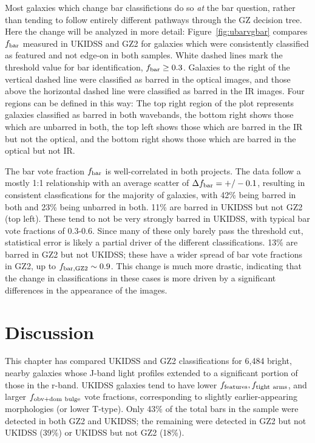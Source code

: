 Most galaxies which change bar classifictions do so \emph{at} the bar question, rather than tending to follow entirely different pathways through the GZ decision tree. Here the change will be analyzed in more detail: Figure~\ref{fig:ubarvgbar} compares $f_{\rm bar}$ measured in UKIDSS and GZ2 for galaxies which were consistently classified as featured and not edge-on in both samples. White dashed lines mark the threshold value for bar identification, $f_{\rm bar}\ge 0.3$. Galaxies to the right of the vertical dashed line were classified as barred in the optical images, and those above the horizontal dashed line were classified as barred in the IR images. Four regions can be defined in this way: The top right region of the plot represents galaxies classified as barred in both wavebands, the bottom right shows those which are unbarred in both, the top left shows those which are barred in the IR but not the optical, and the bottom right shows those which are barred in the optical but not IR.  

The bar vote fraction $f_{\rm bar}$ is well-correlated in both projects. The data follow a mostly 1:1 relationship with an average scatter of $\Delta f_{\rm bar} = +/- 0.1$, resulting in consistent classfications for the majority of galaxies, with 42\% being barred in both and 23\% being unbarred in both. 11\% are barred in UKIDSS but not GZ2 (top left). These tend to not be very strongly barred in UKIDSS, with typical bar vote fractions of 0.3-0.6. Since many of these only barely pass the threshold cut, statistical error is likely a partial driver of the different classifications. 13\% are barred in GZ2 but not UKIDSS; these have a wider spread of bar vote fractions in GZ2, up to $f_{\rm bar,GZ2}\sim0.9$. This change is much more drastic, indicating that the change in classifications in these cases is more driven by a significant differences in the appearance of the images. 

\section{Discussion}

This chapter has compared UKIDSS and GZ2 classifications for 6,484 bright, nearby galaxies whose J-band light profiles extended to a significant portion of those in the r-band. UKIDSS galaxies tend to have lower $f_{\rm features}, f_{\rm tight~arms}$, and larger $f_{\rm obv+dom~bulge}$ vote fractions, corresponding to slightly earlier-appearing morphologies (or lower T-type). Only 43\% of the total bars in the sample were detected in both GZ2 and UKIDSS; the remaining were detected in GZ2 but not UKIDSS (39\%) or UKIDSS but not GZ2 (18\%).

